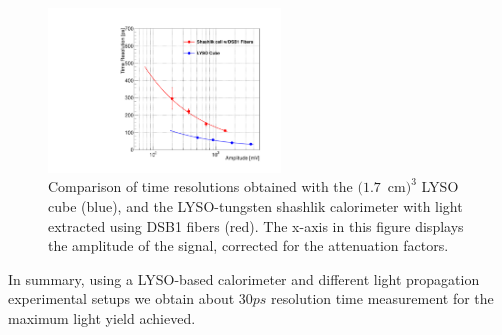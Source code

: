 \begin{figure}[H] \centering
\includegraphics[width=0.55\textwidth]{figs/timing/TimeResolutionVsEnergy_ShashlikDSB1FiberAndCube} 
\caption{Comparison of time resolutions obtained with the $(1.7$~cm$)^{3}$ LYSO cube (blue), 
and the LYSO-tungsten shashlik calorimeter with light extracted using DSB1 fibers (red). 
 The x-axis in this figure displays the amplitude of the
signal, corrected for the attenuation factors. }
\label{fig:ShashlikFiberAndCubeTOF}
\end{figure}

In summary, using a LYSO-based calorimeter and different light propagation experimental setups 
we obtain about $30\unit{ps}$ resolution time measurement for the maximum light yield achieved. 
